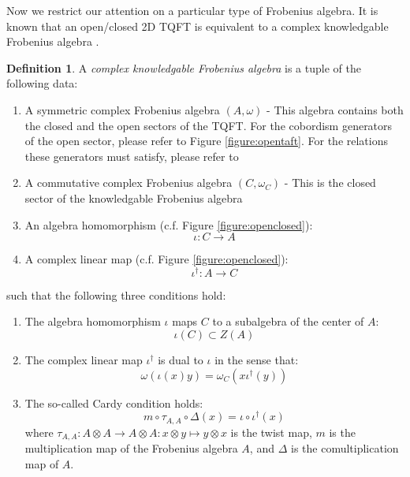 \documentclass[a4paper,11pt]{article}
\theoremstyle{definition}
\newtheorem{definition}{Definition}[section]
\numberwithin{equation}{section}
\begin{document}
Now we restrict our attention on a particular type of Frobenius algebra. It is known that an open/closed 2D TQFT is equivalent to a complex knowledgable Frobenius algebra \cite{frobeniusTQFT3}.
\begin{definition}
    A {\it complex knowledgable Frobenius algebra} is a tuple of the following data:
    \begin{enumerate}
        \item A symmetric complex Frobenius algebra $(A, \omega)$ - This algebra contains both the closed and the open sectors of the TQFT. For the cobordism generators of the open sector, please refer to Figure \ref{figure:opentaft}. For the relations these generators must satisfy, please refer to \cite{frobeniusTQFT3}
        \item A commutative complex Frobenius algebra $(C, \omega_C)$ - This is the closed sector of the knowledgable Frobenius algebra
        \item An algebra homomorphism (c.f. Figure \ref{figure:openclosed}):
        \begin{equation}
            \iota: C\rightarrow A
        \end{equation}
        \item A complex linear map (c.f. Figure \ref{figure:openclosed}):
        \begin{equation}
            \iota^\dagger: A\rightarrow C
        \end{equation}
    \end{enumerate}
    such that the following three conditions hold:
    \begin{enumerate}
        \item The algebra homomorphism $\iota$ maps $C$ to a subalgebra of the center of $A$:
        \begin{equation}
            \iota(C)\subset Z(A)
        \end{equation}
        \item The complex linear map $\iota^\dagger$ is dual to $\iota$ in the sense that:
        \begin{equation}
            \omega(\iota(x)y) = \omega_C(x\iota^\dagger(y))
        \end{equation}
        \item The so-called Cardy condition holds:
        \begin{equation}
            m\circ\tau_{A,A}\circ\Delta(x) = \iota\circ\iota^\dagger(x)
        \end{equation}
        where $\tau_{A,A}:A\otimes A\rightarrow A\otimes A:x\otimes y\mapsto y\otimes x$ is the twist map, $m$ is the multiplication map of the Frobenius algebra $A$, and $\Delta$ is the comultiplication map of $A$.
    \end{enumerate}
\end{definition}
\end{document}
